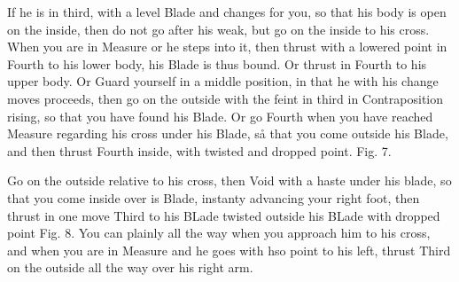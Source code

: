 \newpage


\newpage



If he is in third, with a level Blade and changes for you, so that his
body is open on the inside, then do not go after his weak, but go on
the inside to his cross. When you are in Measure or he steps into it,
then thrust with a lowered point in Fourth to his lower body, his
Blade is thus bound.
Or thrust in Fourth to his upper body. Or Guard yourself in a middle
position, in that he with his change moves proceeds, then go on the
outside with the feint in third in Contraposition rising, so that you
have found his Blade. Or go Fourth when you have reached Measure
regarding his cross under his Blade, så that you come outside his
Blade, and then thrust Fourth inside, with twisted and dropped
point. Fig. 7.

\exercise{}
Go on the outside relative to his cross, then Void with a haste under
his blade, so that you come inside over is Blade, instanty advancing
your right foot, then thrust in one move Third to his BLade twisted
outside his BLade with dropped point Fig. 8. You can plainly all the
way when you approach him to his cross, and when you are in Measure
and he goes with hso point to his left, thrust Third on the outside
all the way over his right arm.

